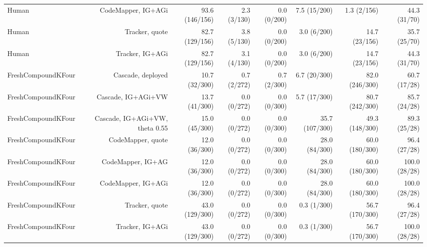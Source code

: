 \begin{table}[t]
{\begin{tabular}{@{}lrrrrrrr@{}}
Human & CodeMapper, IG+AGi & 93.6 (146/156) & 2.3 (3/130) & 0.0 (0/200) & 7.5 (15/200) & 1.3 (2/156) & 44.3 (31/70) \\
Human & Tracker, quote & 82.7 (129/156) & 3.8 (5/130) & 0.0 (0/200) & 3.0 (6/200) & 14.7 (23/156) & 35.7 (25/70) \\
Human & Tracker, IG+AGi & 82.7 (129/156) & 3.1 (4/130) & 0.0 (0/200) & 3.0 (6/200) & 14.7 (23/156) & 44.3 (31/70) \\
FreshCompoundKFour & Cascade, deployed & 10.7 (32/300) & 0.7 (2/272) & 0.7 (2/300) & 6.7 (20/300) & 82.0 (246/300) & 60.7 (17/28) \\
FreshCompoundKFour & Cascade, IG+AGi+VW & 13.7 (41/300) & 0.0 (0/272) & 0.0 (0/300) & 5.7 (17/300) & 80.7 (242/300) & 85.7 (24/28) \\
FreshCompoundKFour & Cascade, IG+AGi+VW, theta 0.55 & 15.0 (45/300) & 0.0 (0/272) & 0.0 (0/300) & 35.7 (107/300) & 49.3 (148/300) & 89.3 (25/28) \\
FreshCompoundKFour & CodeMapper, quote & 12.0 (36/300) & 0.0 (0/272) & 0.0 (0/300) & 28.0 (84/300) & 60.0 (180/300) & 96.4 (27/28) \\
FreshCompoundKFour & CodeMapper, IG+AG & 12.0 (36/300) & 0.0 (0/272) & 0.0 (0/300) & 28.0 (84/300) & 60.0 (180/300) & 100.0 (28/28) \\
FreshCompoundKFour & CodeMapper, IG+AGi & 12.0 (36/300) & 0.0 (0/272) & 0.0 (0/300) & 28.0 (84/300) & 60.0 (180/300) & 100.0 (28/28) \\
FreshCompoundKFour & Tracker, quote & 43.0 (129/300) & 0.0 (0/272) & 0.0 (0/300) & 0.3 (1/300) & 56.7 (170/300) & 96.4 (27/28) \\
FreshCompoundKFour & Tracker, IG+AGi & 43.0 (129/300) & 0.0 (0/272) & 0.0 (0/300) & 0.3 (1/300) & 56.7 (170/300) & 100.0 (28/28) \\
\bottomrule
\end{tabular}
}
\end{table}

